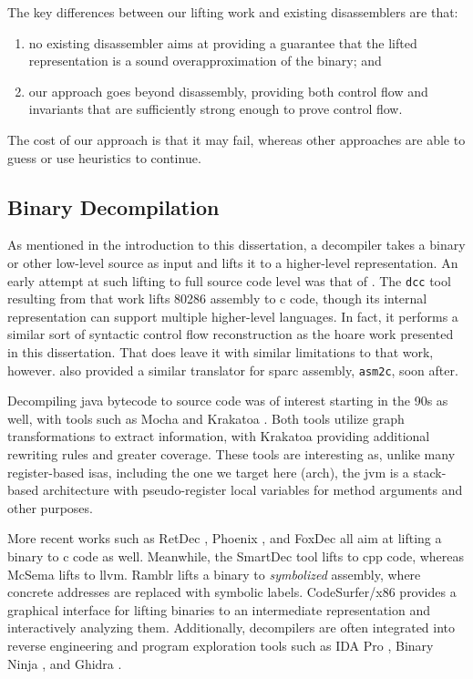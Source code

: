 The key differences between our lifting work and existing disassemblers are that:
\begin{enumerate}
  \item no existing disassembler aims at providing a guarantee that the lifted representation is a sound overapproximation of the binary; and
  \item our approach goes beyond disassembly, providing both control flow and invariants that are sufficiently strong enough to prove control flow.
\end{enumerate}
The cost of our approach is that it may fail, whereas other approaches are able to guess or use heuristics to continue.

\subsection{Binary Decompilation}\label{related-decompilation}
As mentioned in the introduction to this dissertation, a decompiler takes a binary or other low-level source as input and lifts it to a higher-level representation.
An early attempt at such lifting to full source code level was that of \textcite{cifuentes1995decompilation}.
The \lstinline|dcc| tool resulting from that work lifts \gls{80286} assembly to \gls{c} code, though its internal representation can support multiple higher-level languages.
In fact, it performs a similar sort of syntactic control flow reconstruction as the \gls{hoare} work presented in this dissertation.
That does leave it with similar limitations to that work, however.
\Textcite{cifuentes1998assembly} also provided a similar translator for \gls{sparc} assembly, \lstinline|asm2c|, soon after.

Decompiling \gls{java} bytecode to source code was of interest starting in the 90s as well, with tools such as Mocha \autocite{mocha} and Krakatoa \autocite{proebsting1997krakatoa}.
Both tools utilize graph transformations to extract information, with Krakatoa providing additional rewriting rules and greater coverage.
These tools are interesting as, unlike many register-based \glspl{isa}, including the one we target here (\gls{arch}), the \gls{jvm} is a stack-based architecture with pseudo-register local variables for method arguments and other purposes.

More recent works such as RetDec \autocite{retdec}, Phoenix \autocite{brumley2013native}, and FoxDec \autocite{verbeek2020sound} all aim at lifting a binary to \gls{c} code as well.
Meanwhile, the SmartDec tool \autocite{fokin2011smartdec} lifts to \gls{cpp} code, whereas McSema \autocite{dinaburg2014mcsema} lifts to \gls{llvm}.
Ramblr \autocite{wang2017ramblr} lifts a binary to \emph{symbolized} assembly, where concrete addresses are replaced with symbolic labels.
CodeSurfer/\gls{x86} \autocite{balakrishnan2004analyzing,balakrishnan2005codesurfer}
provides a graphical interface for lifting binaries to an intermediate representation and interactively analyzing them.
Additionally, decompilers are often integrated into reverse engineering and program exploration tools such as IDA Pro \autocite{ida-decompiler},
Binary Ninja \autocite{binary-ninja-decompiler}, and Ghidra \autocite{ghidra}.

